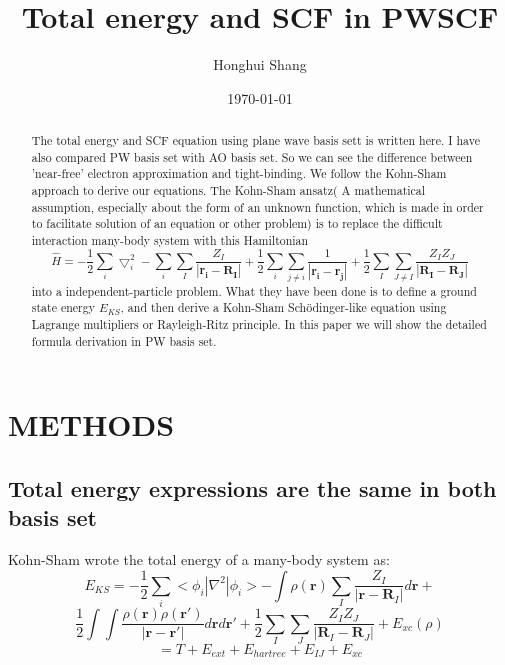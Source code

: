\documentclass[aps,preprint,12pt]{revtex4-1}
\begin{document}
\title{Total energy and SCF in PWSCF}
\author{ Honghui Shang}


\date{\today}

\begin{abstract}
The total energy and SCF equation using plane wave basis sett is written here. I have also compared PW basis set with AO basis set. So we can see the difference between 'near-free' electron approximation and tight-binding.   We follow the Kohn-Sham approach \cite{DFT_KS} to
derive our equations.  The Kohn-Sham ansatz( A mathematical assumption, especially about the form of an 
unknown function, which is made in order to facilitate solution of an equation or other problem) is to replace the difficult interaction many-body system with this Hamiltonian 
\begin{equation}
\hat{H}=-\dfrac{1}{2}\sum_{i}\bigtriangledown^2_{i}-\sum_{i}\sum_{I}\dfrac{Z_I}{|\mathbf{r_i}-\mathbf{R_I}|}
+\dfrac{1}{2}\sum_{i}\sum_{j\neq i}\dfrac{1}{|\mathbf{r_i}-\mathbf{r_j}|}
+\dfrac{1}{2}\sum_{I}\sum_{J\neq I}\dfrac{Z_I Z_J}{|\mathbf{R_I}-\mathbf{R_J}|}
\end{equation} into a independent-particle problem. What they have been done is to define a ground state
energy $E_{KS}$, and then derive a Kohn-Sham Sch\"{o}dinger-like equation using Lagrange multipliers or
Rayleigh-Ritz principle.  In this paper we will show the detailed formula derivation in PW basis set.
\end{abstract}
\maketitle


\section{METHODS}


\subsection{Total energy expressions are the same in both basis set}
Kohn-Sham wrote the total energy of a many-body system as:
\[
E_{KS}=-\dfrac{1}{2}\sum_{i}<\phi_i|\nabla^2|\phi_i>-\int {\rho(\mathbf{r})  \sum_{I}\dfrac{Z_{I}}{|\mathbf{r}-\mathbf{R}_{I}|}  d\mathbf{r}}+
\]
\begin{equation}
 \dfrac{1}{2}\int \int {\dfrac{\rho(\mathbf{r}) \rho(\mathbf{r'}) }{|\mathbf{r}-\mathbf{r'} |}  d\mathbf{r}  d\mathbf{r'}} +\dfrac{1}{2}\sum_{I}\sum_{J}{\dfrac{Z_{I} Z_{J}}{|\mathbf{R}_{I}-\mathbf{R}_{J} |} }+ E_{xc}(\rho)
\label{eq:E_KS}
\end{equation}
\begin{equation}
= T+E_{ext}+E_{hartree}+E_{IJ}+E_{xc}
\end{equation}
\end{document}
